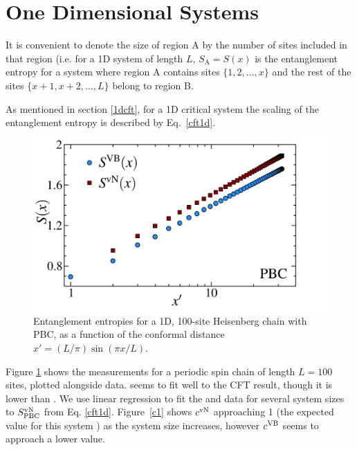 \section{One Dimensional Systems}


It is convenient to denote the size of region A by the number of sites included in that region 
(i.e. for a 1D system of length $L$, $S_{\text{A}} = S(x)$ is the entanglement entropy for a system where region A contains sites $\{1,2,\dots,x\}$ and the rest of the sites $\{x+1,x+2,\dots,L\}$
belong to region B.

As mentioned in section \ref{1dcft}, for a 1D critical system the scaling of the entanglement entropy is described by Eq.~\eqref{cft1d}. 

\begin{figure} {
\includegraphics[width=5.5in]{./figures/paper1/figure1/thesis_pbc.pdf} 
\centering
\caption[1D PBC Results for \vb with \vN]{
Entanglement entropies for a 1D, 100-site Heisenberg chain with PBC, as a function of the conformal distance $x'  = (L/\pi)\sin (\pi x/L)$.
\label{1dPBC}}
} 
\end{figure}

Figure \ref{1dPBC} shows the \vb measurements for a periodic spin chain of length $L=100$ sites, plotted alongside \vn data.  \vb seems to fit well to the CFT result, though it is lower than \vN.
We use linear regression to fit the \vb and \vn data for several system sizes to $S_{\rm PBC}^{\rm vN}$ from Eq. \eqref{cft1d}. Figure~\ref{c1} shows $c^{\rm vN}$ approaching 1 (the expected value for this system ) as the system size increases, however $c^{\rm VB}$ seems to approach a lower value. 

